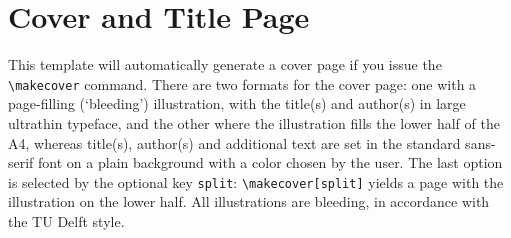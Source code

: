 \section{Cover and Title Page}

This template will automatically generate a cover page if you issue the \texttt{\textbackslash makecover} command. There are two formats for the cover page: one with a page-filling (`bleeding')
illustration, with the title(s) and author(s) in large ultrathin typeface, and the other where the illustration fills the lower half of the A4, whereas title(s), author(s) and additional
text are set in the standard sans-serif font on a plain background with a color chosen by the user. The last option is selected by the optional key \texttt{split}: \texttt{\textbackslash makecover[split]} yields
a page with the illustration on the lower half. All illustrations are bleeding, in accordance with the TU Delft style.

